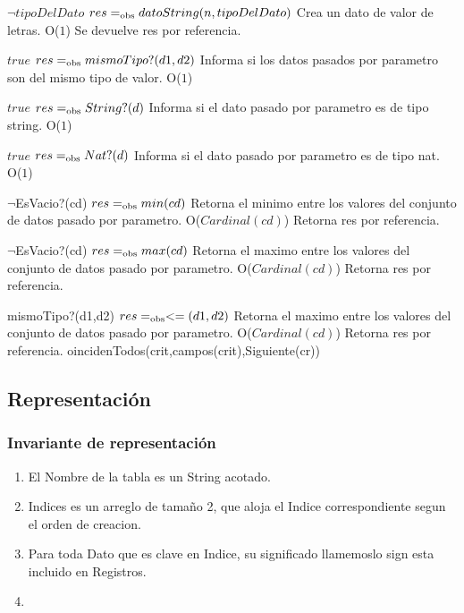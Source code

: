  {$\neg tipoDelDato$}
 {$res =_{\mathrm{obs}} datoString(n,tipoDelDato)$}
 {Crea un dato de valor de letras.}
 {O($1$)}
 {Se devuelve res por referencia.}


 {$true$}
 {$res =_{\mathrm{obs}} mismoTipo?(d1,d2)$}
 {Informa si los datos pasados por parametro son del mismo tipo de valor.}
 {O($1$)}
 {} 
 
 {$true$}
 {$res =_{\mathrm{obs}} String?(d)$}
 {Informa si el dato pasado por parametro es de tipo string.}
 {O($1$)}
 {} 
 
 {$true$}
 {$res =_{\mathrm{obs}} Nat?(d)$}
 {Informa si el dato pasado por parametro es de tipo nat.}
 {O($1$)}
 {}  
 
 {$\neg$EsVacio?(cd)}
 {$res =_{\mathrm{obs}} min(cd)$}
 {Retorna el minimo entre los valores del conjunto de datos pasado por parametro.}
 {O($Cardinal(cd)$)}
 {Retorna res por referencia.}

 {$\neg$EsVacio?(cd)}
 {$res =_{\mathrm{obs}} max(cd)$}
 {Retorna el maximo entre los valores del conjunto de datos pasado por parametro.}
 {O($Cardinal(cd)$)}
 {Retorna res por referencia.}

 {mismoTipo?(d1,d2)}
 {$res =_{\mathrm{obs}} <=(d1,d2)$}
 {Retorna el maximo entre los valores del conjunto de datos pasado por parametro.}
 {O($Cardinal(cd)$)}
 {Retorna res por referencia.}
 oincidenTodos(crit,campos(crit),Siguiente(cr))
\subsection{Representación}


\subsubsection*{Invariante de representación}

\begin{enumerate}
  \item El Nombre de la tabla es un String acotado.
  \item Indices es un arreglo de tamaño 2, que aloja el Indice correspondiente segun el orden de creacion.
  \item Para toda Dato que es clave en Indice, su significado llamemoslo sign esta incluido en Registros.
  \item 

\end{enumerate}


